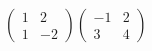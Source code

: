 \hspace*{2mm}\begin{minipage}[t]{\dimexpr\linewidth-2mm\relax}\vspace{0pt}
$\begin{pmatrix} 1 & 2 \\ 1 & -2 \end{pmatrix}\begin{pmatrix} -1 & 2 \\ 3 & 4 \end{pmatrix}$\end{minipage}
